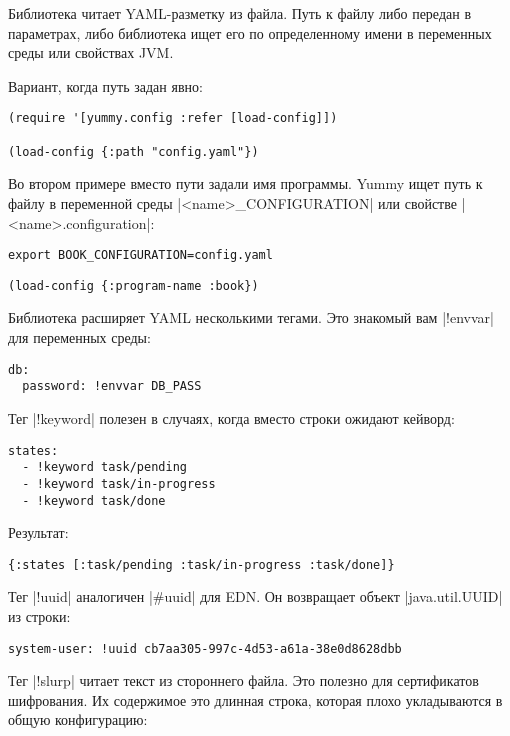 Библиотека читает YAML-разметку из файла. Путь к файлу либо передан в
параметрах, либо библиотека ищет его по определенному имени в переменных среды
или свойствах JVM.

Вариант, когда путь задан явно:

\begin{verbatim}
(require '[yummy.config :refer [load-config]])

(load-config {:path "config.yaml"})
\end{verbatim}

Во втором примере вместо пути задали имя программы. Yummy ищет путь к файлу в
переменной среды \spverb|<name>_CONFIGURATION| или свойстве \spverb|<name>.configuration|:

\begin{verbatim}
export BOOK_CONFIGURATION=config.yaml
\end{verbatim}

\begin{verbatim}
(load-config {:program-name :book})
\end{verbatim}

Библиотека расширяет YAML несколькими тегами. Это знакомый вам \spverb|!envvar| для
переменных среды:

\begin{verbatim}
db:
  password: !envvar DB_PASS
\end{verbatim}

Тег \spverb|!keyword| полезен в случаях, когда вместо строки ожидают кейворд:

\begin{verbatim}
states:
  - !keyword task/pending
  - !keyword task/in-progress
  - !keyword task/done
\end{verbatim}

Результат:

\begin{verbatim}
{:states [:task/pending :task/in-progress :task/done]}
\end{verbatim}

Тег \spverb|!uuid| аналогичен \spverb|#uuid| для EDN. Он возвращает объект
\spverb|java.util.UUID| из строки:

\begin{verbatim}
system-user: !uuid cb7aa305-997c-4d53-a61a-38e0d8628dbb
\end{verbatim}

Тег \spverb|!slurp| читает текст из стороннего файла. Это полезно для сертификатов
шифрования. Их содержимое это длинная строка, которая плохо укладываются в общую
конфигурацию:

